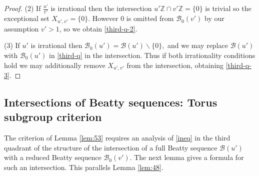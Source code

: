 \documentclass[12pt,letterpaper, reqno]{amsart}
\theoremstyle{definition}
\theoremstyle{remark}
\newcommand{\ZZ}{\ensuremath{\mathbb{Z}}}
\newcommand{\uu}{{u'}}
\newcommand{\vv}{{v'}}
\newcommand{\sB}{{\mathcal B}}
\newcommand{\floor}[1]{\lfloor{#1}\rfloor}
\begin{document}
\begin{proof}

(2) If $\frac{\uu}{\vv}$ is irrational then the intersection $\uu\ZZ\cap\vv\ZZ = \{0\}$ is trivial so the exceptional set $X_{\uu,\vv} = \{ 0\}$.
However $0$ is omitted from $\sB_0({\vv})$ by our assumption $\vv>1$, so we  obtain \eqref{third-q-2}.


(3) If  ${\uu}$ is irrational then $\sB_0({\uu}) = \sB({\uu}) \smallsetminus \{ 0\},$
and  we  may replace $\sB({\uu})$ with $\sB_0({\uu})$ in \eqref{third-q}
in the intersection.
Thus if both irrationality conditions hold we may additionally remove $X_{\uu, \vv}$ from
the intersection, obtaining \eqref{third-q-3}.
\end{proof}

%
%
\subsection{Intersections of Beatty sequences: Torus subgroup criterion}\label{sec:74}

The  criterion of Lemma \ref{lem:53} requires an analysis of \eqref{ineq} in the
third quadrant  of the structure of the intersection of  a full Beatty sequence $\sB(\uu)$ with a reduced Beatty sequence $\sB_0(\vv)$. 
 The next lemma gives a formula for such an intersection.
This parallels Lemma \ref{lem:48}.
 
\end{document}
